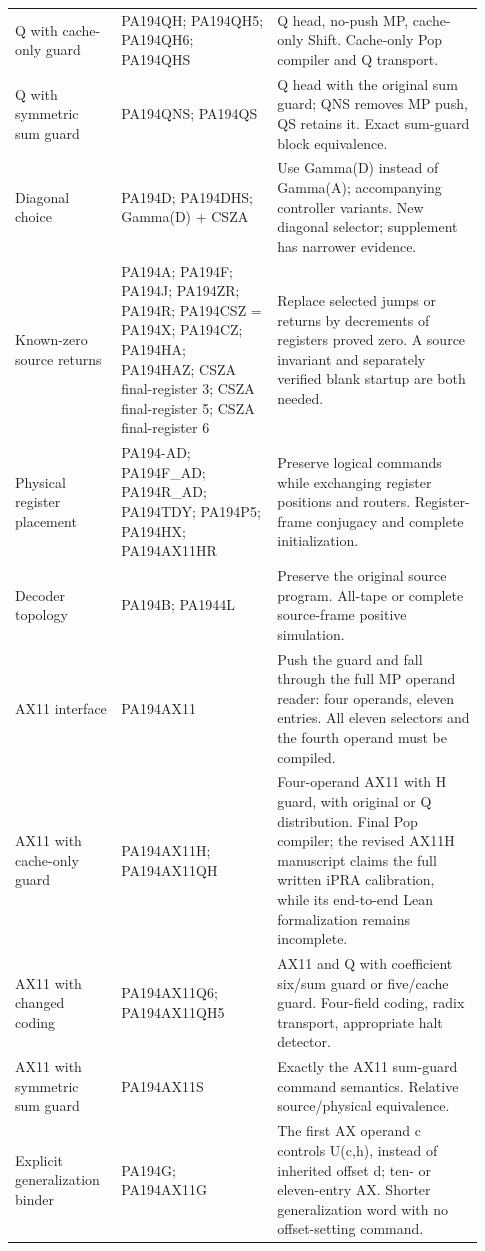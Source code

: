 \begin{longtable}{>{\raggedright\arraybackslash}p{0.21\linewidth}>{\raggedright\arraybackslash}p{0.31\linewidth}>{\raggedright\arraybackslash}p{0.41\linewidth}}
Q with cache-only guard&PA194QH; PA194QH5; PA194QH6; PA194QHS&Q head, no-push MP, cache-only Shift. Cache-only Pop compiler and Q transport.\\[5pt]
Q with symmetric sum guard&PA194QNS; PA194QS&Q head with the original sum guard; QNS removes MP push, QS retains it. Exact sum-guard block equivalence.\\[5pt]
Diagonal choice&PA194D; PA194DHS; Gamma(D) + CSZA&Use Gamma(D) instead of Gamma(A); accompanying controller variants. New diagonal selector; supplement has narrower evidence.\\[5pt]
Known-zero source returns&PA194A; PA194F; PA194J; PA194ZR; PA194R; PA194CSZ = PA194X; PA194CZ; PA194HA; PA194HAZ; CSZA final-register 3; CSZA final-register 5; CSZA final-register 6&Replace selected jumps or returns by decrements of registers proved zero. A source invariant and separately verified blank startup are both needed.\\[5pt]
Physical register placement&PA194-AD; PA194F\_AD; PA194R\_AD; PA194TDY; PA194P5; PA194HX; PA194AX11HR&Preserve logical commands while exchanging register positions and routers. Register-frame conjugacy and complete initialization.\\[5pt]
Decoder topology&PA194B; PA1944L&Preserve the original source program. All-tape or complete source-frame positive simulation.\\[5pt]
AX11 interface&PA194AX11&Push the guard and fall through the full MP operand reader: four operands, eleven entries. All eleven selectors and the fourth operand must be compiled.\\[5pt]
AX11 with cache-only guard&PA194AX11H; PA194AX11QH&Four-operand AX11 with H guard, with original or Q distribution. Final Pop compiler; the revised AX11H manuscript claims the full written iPRA calibration, while its end-to-end Lean formalization remains incomplete.\\[5pt]
AX11 with changed coding&PA194AX11Q6; PA194AX11QH5&AX11 and Q with coefficient six/\allowbreak{}sum guard or five/\allowbreak{}cache guard. Four-field coding, radix transport, appropriate halt detector.\\[5pt]
AX11 with symmetric sum guard&PA194AX11S&Exactly the AX11 sum-guard command semantics. Relative source/\allowbreak{}physical equivalence.\\[5pt]
Explicit generalization binder&PA194G; PA194AX11G&The first AX operand c controls U(c,h), instead of inherited offset d; ten- or eleven-entry AX. Shorter generalization word with no offset-setting command.\\[5pt]

\end{longtable}
